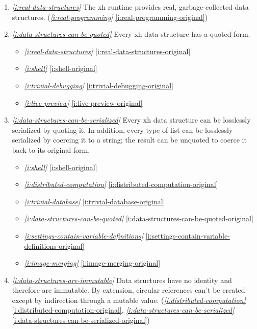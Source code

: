 \documentclass{report}
\makeatletter
\newcommand*{\Label}[2]{%
  \@bsphack
  \begingroup
    \label{#1-original}%
    \def\@currentlabel{#2}%
    \label{#1}%
  \endgroup
  \@esphack
}
\newcommand{\refboth}[1]{{\em \ref{#1}} \ref{#1-original}}
\makeatother
\begin{document}
\begin{enumerate}
\item{}\Label{i:real-data-structures}{datastruct}{\em\ref{i:real-data-structures}}
  The xh runtime provides real, garbage-collected data structures.
(\refboth{i:real-programming})
\item{}\Label{i:data-structures-can-be-quoted}{quotestruct}{\em\ref{i:data-structures-can-be-quoted}}
  Every xh data structure has a quoted form.
\begin{itemize}
\item \refboth{i:real-data-structures}
\item \refboth{i:shell}
\item \refboth{i:trivial-debugging}
\item \refboth{i:live-preview}
\end{itemize}
\item{}\Label{i:data-structures-can-be-serialized}{printstruct}{\em\ref{i:data-structures-can-be-serialized}}
  Every xh data structure can be losslessly serialized by quoting it. In
  addition, every type of list can be losslessly serialized by coercing it
  to a string; the result can be unquoted to coerce it back to its original
  form.
\begin{itemize}
\item \refboth{i:shell}
\item \refboth{i:distributed-computation}
\item \refboth{i:trivial-database}
\item \refboth{i:data-structures-can-be-quoted}
\item \refboth{i:settings-contain-variable-definitions}
\item \refboth{i:image-merging}
\end{itemize}
\item{}\Label{i:data-structures-are-immutable}{immutable}{\em\ref{i:data-structures-are-immutable}}
  Data structures have no identity and therefore are immutable. By
  extension, circular references can't be created except by indirection
  through a mutable value.
(\refboth{i:distributed-computation}, \refboth{i:data-structures-can-be-serialized})


\end{enumerate}
\end{document}
